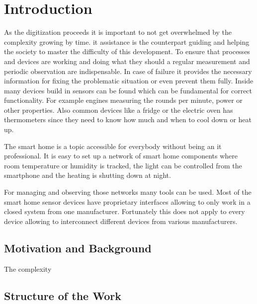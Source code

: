 \chapter{Introduction}
As the digitization proceeds it is important to not get overwhelmed by the complexity growing by time. \gls{it} assistance is the counterpart guiding and helping the society to master the difficulty of this development. To ensure that processes and devices are working and doing what they should a regular measurement and periodic observation are indispensable. In case of failure it provides the necessary information for fixing the problematic situation or even prevent them fully. Inside many devices build in sensors can be found which can be fundamental for correct functionality. For example engines measuring the rounds per minute, power or other properties. Also common devices like a fridge or the electric oven has thermometers since they need to know how much and when to cool down or heat up. 

The smart home is a topic accessible for everybody without being an \gls{it} professional. It is easy to set up a network of smart home components where room temperature or humidity is tracked, the light can be controlled from the smartphone and the heating is shutting down at night. 

For managing and observing those networks many tools can be used. Most of the smart home sensor devices have proprietary interfaces allowing to only work in a closed system from one manufacturer. Fortunately this does not apply to every device allowing to interconnect different devices from various manufacturers. 

\section{Motivation and Background}
The complexity 

\section{Structure of the Work}